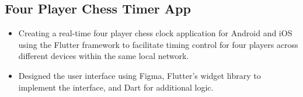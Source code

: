 \documentclass{article}
\begin{document}



\subsection*{Four Player Chess Timer App}

\begin{itemize}
	\item Creating a real-time four player chess clock application for Android and iOS using the Flutter framework to facilitate timing control for four players across different devices within the same local network. 
	\item Designed the user interface using Figma, Flutter's widget library to implement the interface, and Dart for additional logic.
\end{itemize}
\end{document}
